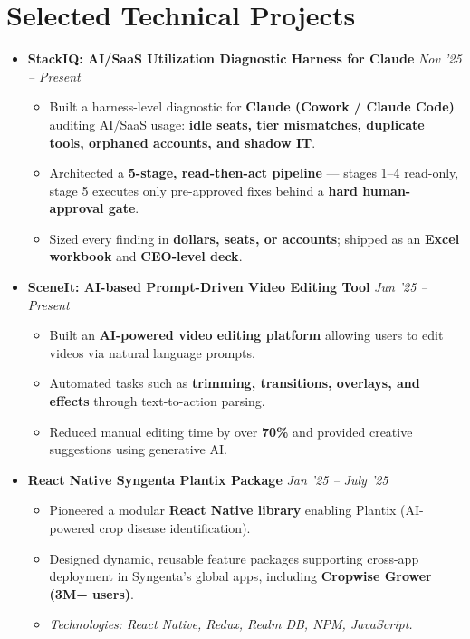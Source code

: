 \documentclass{article}
\begin{document}
\section{Selected Technical Projects}
\small
\begin{itemize}[itemsep=1pt, topsep=1pt]

\item \textbf{StackIQ: AI/SaaS Utilization Diagnostic Harness for Claude} 
\hfill \emph{Nov '25 – Present}
\begin{itemize}
    \item Built a harness-level diagnostic for \textbf{Claude (Cowork / Claude Code)} auditing AI/SaaS usage: \textbf{idle seats, tier mismatches, duplicate tools, orphaned accounts, and shadow IT}.
    \item Architected a \textbf{5-stage, read-then-act pipeline} — stages 1–4 read-only, stage 5 executes only pre-approved fixes behind a \textbf{hard human-approval gate}.
    \item Sized every finding in \textbf{dollars, seats, or accounts}; shipped as an \textbf{Excel workbook} and \textbf{CEO-level deck}.  
\end{itemize}

\item \textbf{SceneIt: AI-based Prompt-Driven Video Editing Tool} 
\hfill \emph{Jun '25 – Present}
\begin{itemize}
    \item Built an \textbf{AI-powered video editing platform} allowing users to edit videos via natural language prompts.  
    \item Automated tasks such as \textbf{trimming, transitions, overlays, and effects} through text-to-action parsing.  
    \item Reduced manual editing time by over \textbf{70\%} and provided creative suggestions using generative AI.  
\end{itemize}

\item \textbf{React Native Syngenta Plantix Package} 
\hfill \emph{Jan '25 – July '25}
\begin{itemize}
    \item Pioneered a modular \textbf{React Native library} enabling Plantix (AI-powered crop disease identification).  
    \item Designed dynamic, reusable feature packages supporting cross-app deployment in Syngenta’s global apps, including \textbf{Cropwise Grower (3M+ users)}.  
    \item \textit{Technologies: React Native, Redux, Realm DB, NPM, JavaScript.}  
\end{itemize}


\end{itemize}
\end{document}

